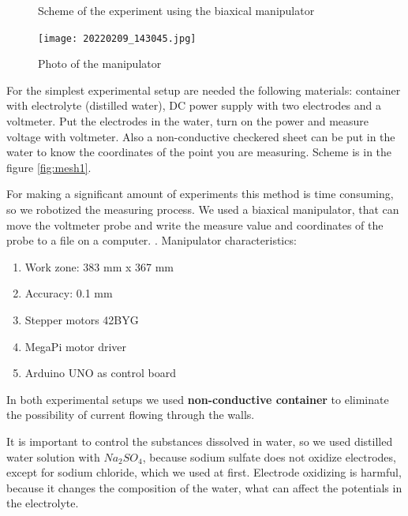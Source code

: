 \documentclass{article}
\begin{document}
\begin{figure}[h]
\begin{center}
\begin{minipage}[h]{0.47\linewidth}
			\caption{Scheme of the experiment using the biaxical manipulator}
			\label{fig:mesh2}
		\end{minipage}
	\end{center}
\end{figure}


\begin{figure}[h]
	\begin{center}
		\texttt{[image: 20220209\_143045.jpg]}
		\caption{Photo of the manipulator}
		\label{manipulator_photo}
	\end{center}
\end{figure}



For the simplest experimental setup are needed the following materials: container with electrolyte (distilled water), DC power supply with two electrodes and a voltmeter. Put the electrodes in the water, turn on the power and measure voltage with voltmeter. Also a non-conductive checkered sheet can be put in the water to know the coordinates of the point you are measuring. Scheme is in the figure \ref{fig:mesh1}.  \par

For making a significant amount of experiments this method is time consuming, so we robotized the measuring process. We used a biaxical manipulator, that can move the voltmeter probe and write the measure value and coordinates of the probe to a file on a computer. 	. Manipulator characteristics:
\begin{enumerate}
\item Work zone: 383 mm x 367 mm
\item Accuracy: 0.1 mm
\item Stepper motors 42BYG
\item MegaPi motor driver
\item Arduino UNO as control board
\end{enumerate}

In both experimental setups we used \textbf{non-conductive container} to eliminate the possibility of current flowing through the walls.\par

It is important to control the substances dissolved in water, so we used distilled water solution with $Na_2SO_4$, because sodium sulfate does not oxidize electrodes, except for sodium chloride, which we used at first. Electrode oxidizing is harmful, because it changes the composition of the water, what can affect the potentials in the electrolyte.\par
\end{document}
